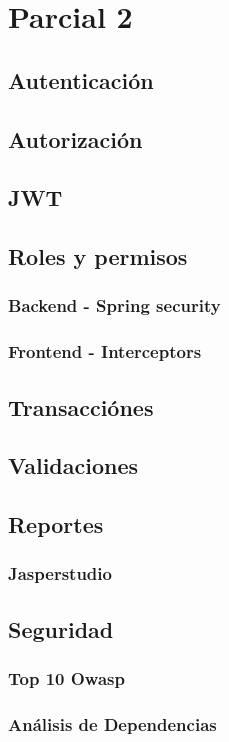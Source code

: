\chapter{Parcial 2}

\section{Autenticación}
\section{Autorización}
\section{JWT}
\section{Roles y permisos}
\subsection{Backend - Spring security}
\subsection{Frontend - Interceptors}


\section{Transacciónes}
\section{Validaciones}
\section{Reportes}
\subsection{Jasperstudio}
\section{Seguridad}
\subsection{Top 10 Owasp}
\subsection{Análisis de Dependencias}
